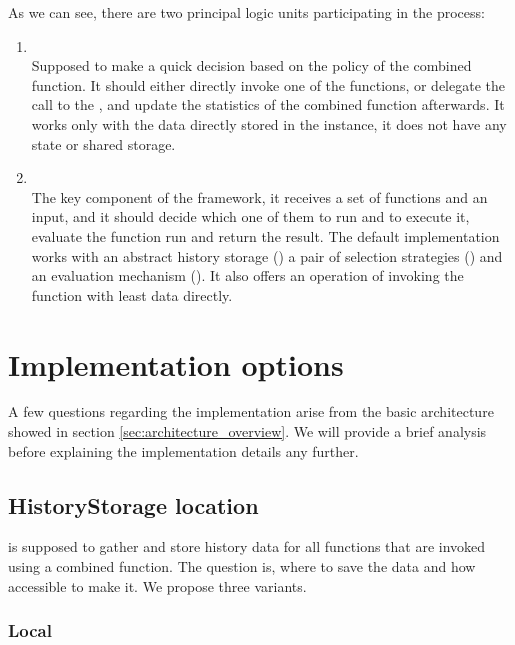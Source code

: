 As we can see, there are two principal logic units participating in the process:

\begin{enumerate}
	\item \textbf{} \\
	Supposed to make a quick decision based on the policy of the combined function. It should either directly invoke one of the functions, or delegate the call to the , and update the statistics of the combined function afterwards. It works only with the data directly stored in the  instance, it does not have any state or shared storage.
	\item \textbf{} \\
	The key component of the framework, it receives a set of functions and an input, and it should decide which one of them to run and to execute it, evaluate the function run and return the result. The default implementation works with an abstract history storage () a pair of selection strategies () and an evaluation mechanism (). It also offers an operation of invoking the function with least data directly.
\end{enumerate}

\section{Implementation options}

A few questions regarding the implementation arise from the basic architecture showed in section \ref{sec:architecture_overview}. We will provide a brief analysis before explaining the implementation details any further.

\subsection{HistoryStorage location}
\label{subsec:storing}

 is supposed to gather and store history data for all functions that are invoked using a combined function. The question is, where to save the data and how accessible to make it. We propose three variants.

\subsubsection{Local}

